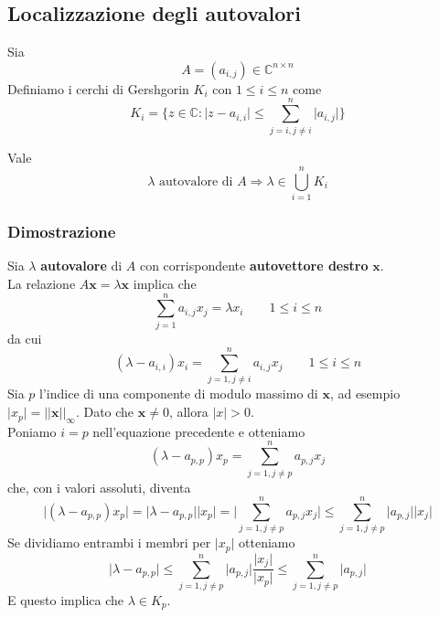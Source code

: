 \newpage
\subsection{Localizzazione degli autovalori}
\begin{definition}
	Sia
	\begin{equation*}
		A = (a_{i,j}) \in \mathbb{C}^{n \times n}
	\end{equation*}
	Definiamo i cerchi di Gershgorin $K_i$ con $1 \leq i \leq n$ come
	\begin{equation}
		K_i = \{z \in \mathbb{C} : \lvert z - a_{i,i} \rvert \leq \sum_{j=i, j \neq i}^{n}\lvert a_{i,j} \rvert\}
	\end{equation}
\end{definition}

\begin{theorem}
	Vale
	\begin{equation}
		\lambda \text{ autovalore di } A \Longrightarrow \lambda \in \bigcup_{i=1}^n K_i
	\end{equation}
\end{theorem}

\subsubsection{Dimostrazione}
Sia $\lambda$ \textbf{autovalore} di $A$ con corrispondente \textbf{autovettore destro} $\mathbf{x}$.\\
La relazione $A\mathbf{x} = \lambda \mathbf{x}$ implica che
\begin{equation*}
	\sum_{j=1}^{n}a_{i,j}x_j = \lambda x_i \quad\quad 1 \leq i \leq n
\end{equation*}
da cui
\begin{equation}
	(\lambda - a_{i,i})x_i = \sum_{j=1,j \neq i}^{n}a_{i,j}x_j \quad\quad 1 \leq i \leq n
\end{equation}
Sia $p$ l'indice di una componente di modulo massimo di $\mathbf{x}$, ad esempio $\lvert x_p \rvert = \lvert\lvert \mathbf{x} \rvert\rvert _\infty$. Dato che $\mathbf{x} \neq 0$, allora $\lvert x \rvert >0$.\\
Poniamo $i=p$ nell'equazione precedente e otteniamo
\begin{equation*}
	(\lambda - a_{p,p})x_p = \sum_{j=1,j \neq p}^{n}a_{p,j}x_j
\end{equation*}
che, con i valori assoluti, diventa
\begin{equation*}
	\lvert(\lambda - a_{p,p})x_p\rvert = \lvert \lambda - a_{p,p} \rvert \lvert x_{p} \rvert= \bigg\lvert\sum_{j=1,j \neq p}^{n}a_{p,j}x_j \bigg\rvert \leq \sum_{j=1,j \neq p}^{n}\lvert a_{p,j}\rvert \lvert x_j\rvert
\end{equation*}
Se dividiamo entrambi i membri per $\lvert x_p \rvert$ otteniamo
\begin{equation*}
	\lvert \lambda - a_{p,p} \rvert \leq \sum_{j=1,j \neq p}^{n}\lvert a_{p,j}\rvert \frac{\lvert x_j\rvert}{\lvert x_p \rvert} \leq \sum_{j=1,j \neq p}^{n}\lvert a_{p,j}\rvert
\end{equation*}
E questo implica che $\lambda \in K_p$.


